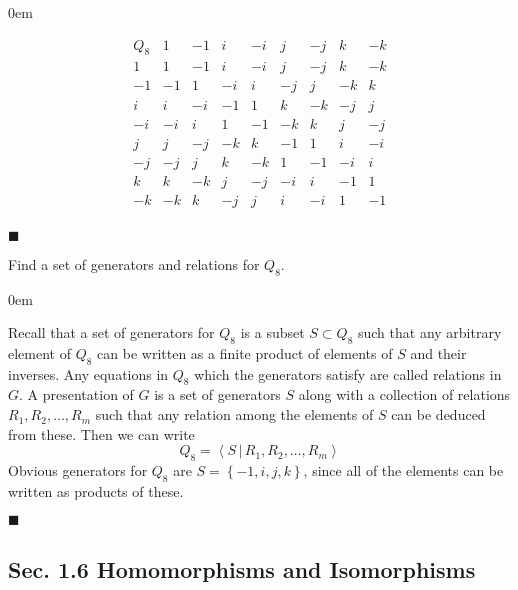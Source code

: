 \documentclass[12pt]{article}
\renewcommand{\qed}{\hfill$\blacksquare$}
\renewenvironment{proof}{\begin{addmargin}[1em]{0em}\begin{newproof}}{\end{newproof}\end{addmargin}\qed}
\newenvironment{problem}[2][Exercise]{\begin{trivlist}
\item[\hskip \labelsep {\bfseries #1}\hskip \labelsep {\bfseries #2.}]}{\end{trivlist}}
\begin{document}
\begin{proof}
\begin{equation*}
\begin{array}{c|cccccccc}
Q_8 & 1 & -1 & i & -i & j & -j & k & -k \\ \hline
1  & 1 & -1 & i & -i & j & -j  & k & -k \\
-1 & -1 & 1 & -i & i & -j & j & -k & k \\
i  & i & -i & -1 & 1 & k & -k & -j  & j \\
-i & -i & i & 1 & -1 & -k & k & j & -j \\
j  & j & -j & -k & k & -1 & 1 & i & -i \\
-j & -j & j & k & -k & 1 & -1 & -i & i \\
k  & k & -k & j & -j & -i & i & -1 & 1 \\
-k & -k & k & -j & j & i & -i & 1 & -1 \\
\end{array}
\end{equation*}
\end{proof}



\begin{problem}{1.5.3}
Find a set of generators and relations for $Q_8$.
\end{problem}
\begin{proof}
Recall that a set of generators for $Q_8$ is a subset $S\subset Q_8$ such that any arbitrary element of $Q_8$ can be written as a finite product of elements of $S$ and their inverses. Any equations in $Q_8$ which the generators satisfy are called relations in $G$. A presentation of $G$ is a set of generators $S$ along with a collection of relations $R_1,R_2,\dots,R_m$ such that any relation among the elements of $S$ can be deduced from these. Then we can write $$ Q_8 = \left\langle S\,|\, R_1,R_2,\ldots,R_m\right\rangle $$
Obvious generators for $Q_8$ are $S=\left\{-1,i,j,k\right\}$, since all of the elements can be written as products of these.

\end{proof}





\subsection*{Sec. 1.6 Homomorphisms and Isomorphisms}
\end{document}
